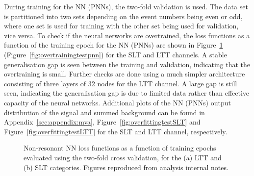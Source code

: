 During training for the NN (PNNs), the two-fold validation is used. 
The data set is partitioned into two sets depending on 
the event numbers being even or odd, where one set is used for
training with the other set being used for validation, vice versa.
To check if the neural networks are overtrained, 
the loss functions as a function of the training epoch for 
the NN (PNNs) are shown in Figure~\ref{fig:overtrainingtestnn} 
(Figure~\ref{fig:overtrainingtestpnn}) for the 
SLT and LTT channels. A stable generalisation gap is seen between 
the training and validation, indicating that the overtraining is small.
Further checks are done using a much simpler architecture consisting of three layers
of 32 nodes for the LTT channel. A large gap is still seen, indicating the
generalisation gap is due to limited data rather than effective capacity of
the neural networks.
Additional plots of the NN (PNNs) output distribution of the signal and summed background
can be found in Appendix~\ref{sec:appendix:mva}, 
Figure~\ref{fig:overfittingtestSLT} and Figure~\ref{fig:overfittingtestLTT}
for the SLT and LTT channel, respectively. 

\begin{figure}
  \centering
  \quad
  \quad
  \caption{Non-resonant NN loss functions as a function of training epochs evaluated 
  using the two-fold cross validation, for the (a) LTT and (b) SLT categories. 
  Figures reproduced from analysis internal notes. 
  }
  \label{fig:overtrainingtestnn}
\end{figure}

